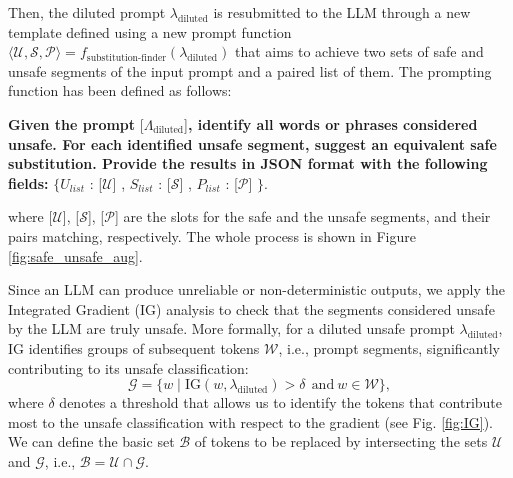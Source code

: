 \documentclass[acmsmall]{acmart}
\begin{document}
{Then, the diluted prompt \( \lambda_{\text{diluted}} \) is resubmitted to the LLM through a new template defined using a new prompt function $\langle \mathcal{U},\mathcal{S},\mathcal{P} \rangle= f_{\text{substitution-finder}}(\lambda_{\text{diluted}})$ that aims to achieve two sets of safe and unsafe segments of the input prompt and a paired list of them. The prompting function has been defined as follows:
\begin{tcolorbox}[enhanced, colback=white,
    width=1\linewidth, center upper, halign=left, left=1mm, right=1mm,
    fontupper=\small, drop shadow southwest, sharp corners,  title={Template of $f_{\text{substitution-finder}}(\lambda_\text{diluted})$}, coltitle=black, 
        boxed title style={opacityback=0,colframe=white,size=fbox,arc=0mm},
    attach boxed title to top left={yshift=-\tcboxedtitleheight/2,xshift=3mm}]
\begin{center}
\footnotesize
\textbf{Given the prompt} [$\Lambda_{\text{diluted}}$]\textbf{, identify all words or phrases considered unsafe. For each identified unsafe segment, suggest an equivalent safe substitution. Provide the results in JSON format with the following fields:}
$\{U_{list}$ : [$\mathcal{U}$] , $S_{list}$ : [$\mathcal{S}$] , $P_{list}$ : [$\mathcal{P}$]
$\}$.
\end{center}
\end{tcolorbox}
\noindent
where [\(\mathcal{U}\)], [\( \mathcal{S}\)], [\(\mathcal{P}\)] are the slots for the safe and the unsafe segments, and their pairs matching, respectively. The whole process is shown in Figure \ref{fig:safe_unsafe_aug}.


Since an LLM can produce unreliable or non-deterministic outputs, we apply the Integrated Gradient (IG) analysis \cite{sundararajan2017axiomatic} to check that the segments considered unsafe by the LLM are truly unsafe. More formally, for a diluted unsafe prompt \( \lambda_{\text{diluted}} \), IG identifies groups of subsequent tokens $\mathcal{W}$, i.e., prompt segments, significantly contributing to its unsafe classification:
\begin{equation}
\mathcal{G} = \{w \mid \text{IG}(w, \lambda_{\text{diluted}}) > \delta~~\text{and}~w\in\mathcal{W}\},
\end{equation} 
where \( \delta \) denotes a threshold that allows us to identify the tokens that contribute most to the unsafe classification with respect to the gradient (see Fig. \ref{fig:IG}). We can define the basic set \( \mathcal{B} \) of tokens to be replaced by intersecting the sets $\mathcal{U}$ and $\mathcal{G}$, i.e., $\mathcal{B} = \mathcal{U} \cap \mathcal{G}$.

}
\end{document}
